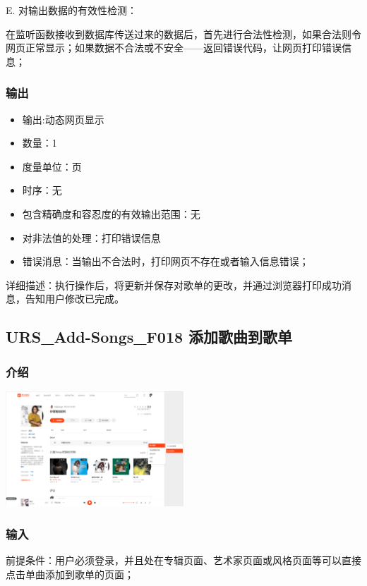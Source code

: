 			   E. 对输出数据的有效性检测：
			   
			   在监听函数接收到数据库传送过来的数据后，首先进行合法性检测，如果合法则令网页正常显示；如果数据不合法或不安全——返回错误代码，让网页打印错误信息；
			   
			   \subsubsection{输出}
			   \begin{itemize}
				   \item	输出:动态网页显示
				   \item	数量：1
				   \item	度量单位：页
				   \item	时序：无
				   \item	包含精确度和容忍度的有效输出范围：无
				   \item	对非法值的处理：打印错误信息
				   \item	错误消息：当输出不合法时，打印网页不存在或者输入信息错误；
				  \end{itemize}
				详细描述：执行操作后，将更新并保存对歌单的更改，并通过浏览器打印成功消息，告知用户修改已完成。
			




				\subsection{URS\_Add-Songs\_F018 添加歌曲到歌单}
				  \subsubsection{介绍}
			   
				  \begin{center}
				   \includegraphics[width=0.5\textwidth]{./figures/capture17.png} 
	
				\end{center}
				  \subsubsection{输入}
				  前提条件：用户必须登录，并且处在专辑页面、艺术家页面或风格页面等可以直接点击单曲添加到歌单的页面；
			   
